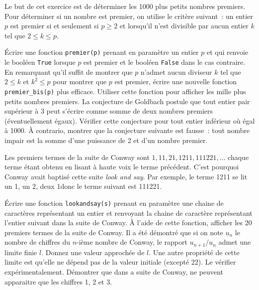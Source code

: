 \documentclass{magnolia}
\begin{document}
Le but de cet exercice est de déterminer les 1000 plus petits nombres premiers. Pour
déterminer si un nombre est premier, on utilise le critère suivant~: un entier $p$ est
premier si et seulement si $p\geq 2$ et lorsqu'il n'est divisible par aucun entier
$k$ tel que $2\leq k\leq p$.
\begin{questions}
\question Écrire une fonction \verb!premier(p)! prenant en paramètre un entier $p$ et qui
  renvoie le booléen \verb!True! lorsque $p$ est premier et le booléen \verb!False!
	dans le cas contraire.
\question En remarquant qu'il suffit de montrer que $p$ n'admet aucun diviseur $k$
  tel que $2\leq k$ et $k^2\leq p$ pour montrer que $p$ est premier, écrire une
  nouvelle fonction \verb!premier_bis(p)! plus efficace.
\question Utiliser cette fonction pour afficher les mille plus petits nombres premiers.
\question La conjecture de Goldbach postule que tout entier pair supérieur à 3
  peut s'écrire comme somme de deux nombres premiers (éventuellement égaux). Vérifier
	cette conjecture pour tout entier inférieur où égal à 1000.
\question À contrario, montrer que la conjecture suivante est fausse~: tout nombre impair
  est la somme d'une puissance de 2 et d'un nombre premier.
\end{questions}

Les premiers termes de la suite de Conway sont $1, 11, 21, 1211, 111221,\ldots$
chaque terme étant obtenu en lisant à haute voix le terme précédent. C'est pourquoi
Conway avait baptisé cette suite \emph{look and say}. Par exemple, le terme
1211 se lit \og un 1, un 2, deux 1\fg donc le terme suivant est 111221.
\begin{questions}
\question Écrire une fonction \verb!lookandsay(s)! prenant en paramètre une chaine de
  caractères représentant un entier et renvoyant la chaine de caractère représentant
	l'entier suivant dans la suite de Conway.
\question À l'aide de cette fonction, afficher les 20 premiers termes de la suite de
  Conway.
\question Il a été démontré que si on note $u_n$ le nombre de chiffres du $n$-ième
  nombre de Conway, le rapport $u_{n+1}/u_n$ admet une limite finie $l$.
	Donnez une valeur approchée de $l$.
\question Une autre propriété de cette limite est qu'elle ne dépend pas de la
  valeur initiale (excepté 22). Le vérifier expérimentalement.
\question Démontrer que dans a suite de Conway, ne peuvent apparaitre que les chiffres 1, 2 et 3.
\end{questions}

\end{document}
